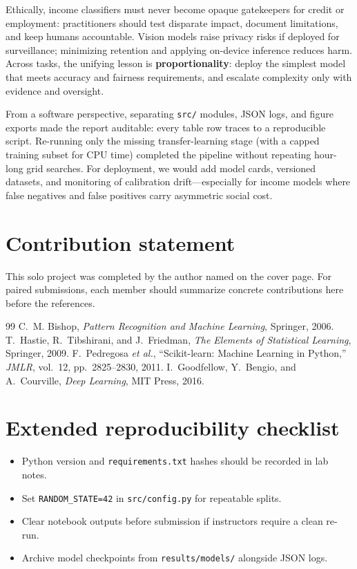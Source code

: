 \documentclass[11pt,a4paper]{article}
\begin{document}
Ethically, income classifiers must never become opaque gatekeepers for credit or employment: practitioners should test disparate impact, document limitations, and keep humans accountable.
Vision models raise privacy risks if deployed for surveillance; minimizing retention and applying on-device inference reduces harm.
Across tasks, the unifying lesson is \textbf{proportionality}: deploy the simplest model that meets accuracy and fairness requirements, and escalate complexity only with evidence and oversight.

From a software perspective, separating \texttt{src/} modules, JSON logs, and figure exports made the report auditable: every table row traces to a reproducible script.
Re-running only the missing transfer-learning stage (with a capped training subset for CPU time) completed the pipeline without repeating hour-long grid searches.
For deployment, we would add model cards, versioned datasets, and monitoring of calibration drift---especially for income models where false negatives and false positives carry asymmetric social cost.

\section*{Contribution statement}
This solo project was completed by the author named on the cover page. For paired submissions, each member should summarize concrete contributions here before the references.

\begin{thebibliography}{99}
 C.~M. Bishop, \emph{Pattern Recognition and Machine Learning}, Springer, 2006.
 T.~Hastie, R.~Tibshirani, and J.~Friedman, \emph{The Elements of Statistical Learning}, Springer, 2009.
 F.~Pedregosa \emph{et al.}, ``Scikit-learn: Machine Learning in Python,'' \emph{JMLR}, vol.~12, pp.~2825--2830, 2011.
 I.~Goodfellow, Y.~Bengio, and A.~Courville, \emph{Deep Learning}, MIT Press, 2016.
\end{thebibliography}

\appendix
\section{Extended reproducibility checklist}
\begin{itemize}[leftmargin=*]
\item Python version and \texttt{requirements.txt} hashes should be recorded in lab notes.
\item Set \texttt{RANDOM\_STATE=42} in \texttt{src/config.py} for repeatable splits.
\item Clear notebook outputs before submission if instructors require a clean re-run.
\item Archive model checkpoints from \texttt{results/models/} alongside JSON logs.
\end{itemize}
\end{document}

